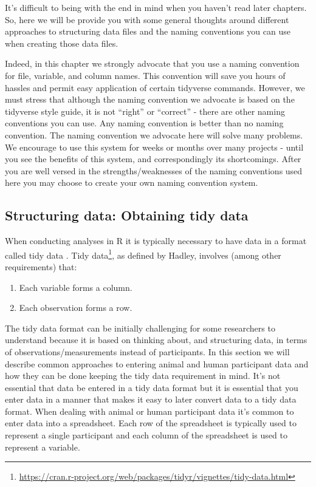 \documentclass[
]{krantz}
\renewcommand{\href}[2]{#2\footnote{\url{#1}}}
\begin{document}
It's difficult to being with the end in mind when you haven't read later chapters. So, here we will be provide you with some general thoughts around different approaches to structuring data files and the naming conventions you can use when creating those data files.

Indeed, in this chapter we strongly advocate that you use a naming convention for file, variable, and column names. This convention will save you hours of hassles and permit easy application of certain tidyverse commands. However, we must stress that although the naming convention we advocate is based on the tidyverse style guide, it is not ``right'' or ``correct'' - there are other naming conventions you can use. Any naming convention is better than no naming convention. The naming convention we advocate here will solve many problems. We encourage to use this system for weeks or months over many projects - until you see the benefits of this system, and correspondingly its shortcomings. After you are well versed in the strengths/weaknesses of the naming conventions used here you may choose to create your own naming convention system.

\hypertarget{structuring-data-obtaining-tidy-data}{%
\subsection{Structuring data: Obtaining tidy data}\label{structuring-data-obtaining-tidy-data}}

When conducting analyses in R it is typically necessary to have data in a format called tidy data \citep{tidy-data}. \href{https://cran.r-project.org/web/packages/tidyr/vignettes/tidy-data.html}{Tidy data}, as defined by Hadley, involves (among other requirements) that:

\begin{enumerate}
\def\labelenumi{\arabic{enumi}.}
\item
  Each variable forms a column.
\item
  Each observation forms a row.
\end{enumerate}

The tidy data format can be initially challenging for some researchers to understand because it is based on thinking about, and structuring data, in terms of observations/measurements instead of participants. In this section we will describe common approaches to entering animal and human participant data and how they can be done keeping the tidy data requirement in mind. It's not essential that data be entered in a tidy data format but it is essential that you enter data in a manner that makes it easy to later convert data to a tidy data format. When dealing with animal or human participant data it's common to enter data into a spreadsheet. Each row of the spreadsheet is typically used to represent a single participant and each column of the spreadsheet is used to represent a variable.
\end{document}
